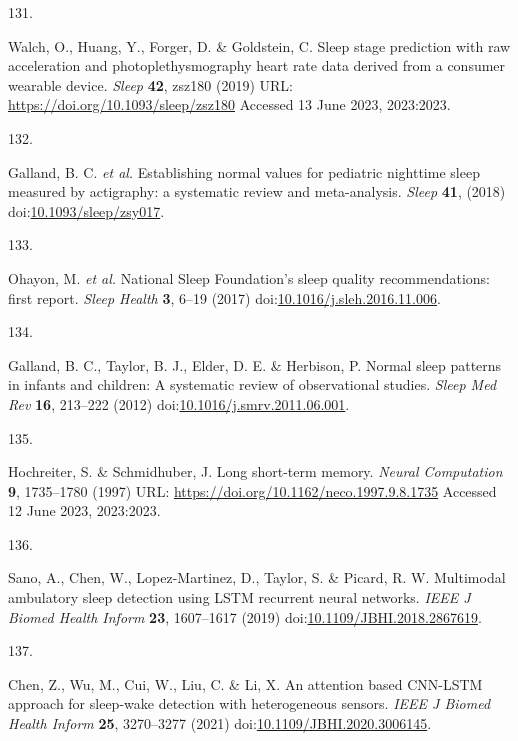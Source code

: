 \documentclass[
  9pt,
]{scrbook}
\newlength{\cslhangindent}
\newlength{\csllabelwidth}
\newlength{\cslentryspacingunit} %
\newenvironment{CSLReferences}[2] %
 {%
  \setlength{\parindent}{0pt}
  \ifodd #1
  \let\oldpar\par
  \def\par{\hangindent=\cslhangindent\oldpar}
  \fi
  \setlength{\parskip}{#2\cslentryspacingunit}
 }%
 {}
\newcommand{\CSLLeftMargin}[1]{\parbox[t]{\csllabelwidth}{#1}}
\newcommand{\CSLRightInline}[1]{\parbox[t]{\linewidth - \csllabelwidth}{#1}\break}
\begin{document}
\begin{CSLReferences}{0}{0}
\leavevmode{}%
\CSLLeftMargin{131. }%
\CSLRightInline{Walch, O., Huang, Y., Forger, D. \& Goldstein, C. Sleep
stage prediction with raw acceleration and photoplethysmography heart
rate data derived from a consumer wearable device. \emph{Sleep}
\textbf{42}, zsz180 (2019) URL:
\url{https://doi.org/10.1093/sleep/zsz180} Accessed 13 June 2023,
2023:2023.}

\leavevmode{}%
\CSLLeftMargin{132. }%
\CSLRightInline{Galland, B. C. \emph{et al.} Establishing normal values
for pediatric nighttime sleep measured by actigraphy: a systematic
review and meta-analysis. \emph{Sleep} \textbf{41}, (2018)
doi:\href{https://doi.org/10.1093/sleep/zsy017}{10.1093/sleep/zsy017}.}

\leavevmode{}%
\CSLLeftMargin{133. }%
\CSLRightInline{Ohayon, M. \emph{et al.} National Sleep Foundation's
sleep quality recommendations: first report. \emph{Sleep Health}
\textbf{3}, 6--19 (2017)
doi:\href{https://doi.org/10.1016/j.sleh.2016.11.006}{10.1016/j.sleh.2016.11.006}.}

\leavevmode{}%
\CSLLeftMargin{134. }%
\CSLRightInline{Galland, B. C., Taylor, B. J., Elder, D. E. \& Herbison,
P. Normal sleep patterns in infants and children: A systematic review of
observational studies. \emph{Sleep Med Rev} \textbf{16}, 213--222 (2012)
doi:\href{https://doi.org/10.1016/j.smrv.2011.06.001}{10.1016/j.smrv.2011.06.001}.}

\leavevmode{}%
\CSLLeftMargin{135. }%
\CSLRightInline{Hochreiter, S. \& Schmidhuber, J. Long short-term
memory. \emph{Neural Computation} \textbf{9}, 1735--1780 (1997) URL:
\url{https://doi.org/10.1162/neco.1997.9.8.1735} Accessed 12 June 2023,
2023:2023.}

\leavevmode{}%
\CSLLeftMargin{136. }%
\CSLRightInline{Sano, A., Chen, W., Lopez-Martinez, D., Taylor, S. \&
Picard, R. W. Multimodal ambulatory sleep detection using {LSTM}
recurrent neural networks. \emph{{IEEE} J Biomed Health Inform}
\textbf{23}, 1607--1617 (2019)
doi:\href{https://doi.org/10.1109/JBHI.2018.2867619}{10.1109/JBHI.2018.2867619}.}

\leavevmode{}%
\CSLLeftMargin{137. }%
\CSLRightInline{Chen, Z., Wu, M., Cui, W., Liu, C. \& Li, X. An
attention based {CNN}-{LSTM} approach for sleep-wake detection with
heterogeneous sensors. \emph{{IEEE} J Biomed Health Inform} \textbf{25},
3270--3277 (2021)
doi:\href{https://doi.org/10.1109/JBHI.2020.3006145}{10.1109/JBHI.2020.3006145}.}


\end{CSLReferences}
\end{document}
